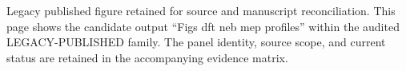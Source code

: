 Legacy published figure retained for source and manuscript reconciliation. This page shows the candidate output ``Figs dft neb mep profiles'' within the audited LEGACY-PUBLISHED family. The panel identity, source scope, and current status are retained in the accompanying evidence matrix.
